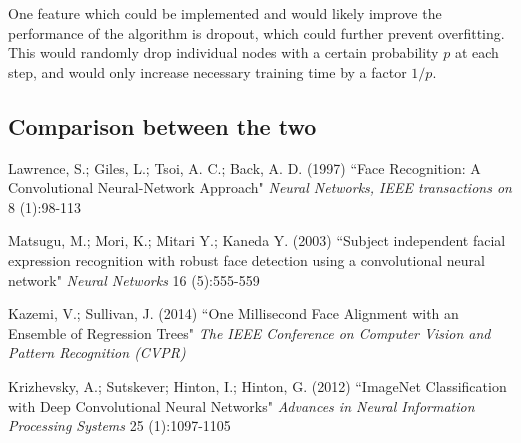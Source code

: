 \documentclass[10pt, twocolumn, twoside]{article}
\begin{document}
One feature which could be implemented and would likely improve the performance of the algorithm is dropout, which could further prevent overfitting. This would randomly drop individual nodes with a certain probability $p$ at each step, and would only increase necessary training time by a factor $1/p$.



\subsection{Comparison between the two}

\begin{thebibliography}{9}
Lawrence, S.; Giles, L.; Tsoi, A. C.; Back, A. D. (1997)
``Face Recognition: A Convolutional Neural-Network Approach"
\textit{Neural Networks, IEEE transactions on} 8 (1):98-113

Matsugu, M.; Mori, K.; Mitari Y.; Kaneda Y. (2003)
``Subject independent facial expression recognition with robust face detection using a convolutional neural network"
\textit{Neural Networks} 16 (5):555-559

Kazemi, V.; Sullivan, J. (2014)
``One Millisecond Face Alignment with an Ensemble of Regression Trees"
\textit{The IEEE Conference on Computer Vision and Pattern Recognition (CVPR)}

Krizhevsky, A.; Sutskever; Hinton, I.; Hinton, G. (2012)
``ImageNet Classification with Deep Convolutional Neural Networks"
\textit{Advances in Neural Information Processing Systems} 25 (1):1097-1105
\end{thebibliography}
\end{document}
